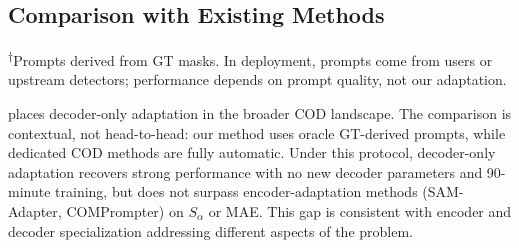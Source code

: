 \subsection{Comparison with Existing Methods}

\begin{table}[t]
\centering
\caption{\textbf{Comparison with COD methods} on COD10K test set. This table contextualizes decoder-only adaptation within the broader COD landscape. \emph{Important:} our method uses oracle GT-derived prompts, while dedicated methods are fully automatic; these are not head-to-head comparisons.\textsuperscript{$\dagger$}}
\label{tab:comparison}
\small
{}
\vspace{1pt}
{\footnotesize \textsuperscript{$\dagger$}Prompts derived from GT masks. In deployment, prompts come from users or upstream detectors; performance depends on prompt quality, not our adaptation.}
\end{table}

 places decoder-only adaptation in the broader COD landscape. The comparison is contextual, not head-to-head: our method uses oracle GT-derived prompts, while dedicated COD methods are fully automatic. Under this protocol, decoder-only adaptation recovers strong performance with no new decoder parameters and 90-minute training, but does not surpass encoder-adaptation methods (SAM-Adapter, COMPrompter) on $S_\alpha$ or MAE. This gap is consistent with encoder and decoder specialization addressing different aspects of the problem.

